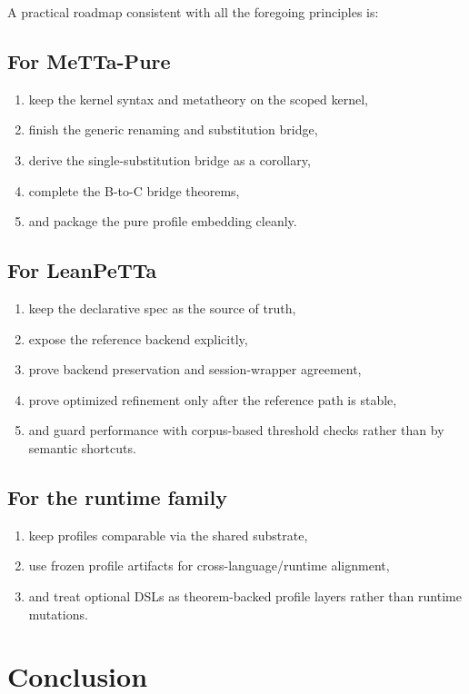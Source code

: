\documentclass[11pt]{article}
\begin{document}
A practical roadmap consistent with all the foregoing principles is:

\subsection*{For MeTTa-Pure}
\begin{enumerate}
  \item keep the kernel syntax and metatheory on the scoped kernel,
  \item finish the generic renaming and substitution bridge,
  \item derive the single-substitution bridge as a corollary,
  \item complete the B-to-C bridge theorems,
  \item and package the pure profile embedding cleanly.
\end{enumerate}

\subsection*{For LeanPeTTa}
\begin{enumerate}
  \item keep the declarative spec as the source of truth,
  \item expose the reference backend explicitly,
  \item prove backend preservation and session-wrapper agreement,
  \item prove optimized refinement only after the reference path is stable,
  \item and guard performance with corpus-based threshold checks rather than by semantic shortcuts.
\end{enumerate}

\subsection*{For the runtime family}
\begin{enumerate}
  \item keep profiles comparable via the shared substrate,
  \item use frozen profile artifacts for cross-language/runtime alignment,
  \item and treat optional DSLs as theorem-backed profile layers rather than runtime mutations.
\end{enumerate}

\section{Conclusion}
\end{document}
